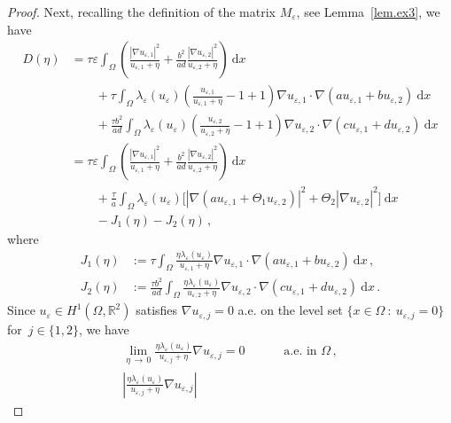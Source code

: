 \documentclass[AHL,Unicode,longabstracts,published]{cedram}
\newcommand{\bbR}{\mathbb{R}}
\newcommand{\rmd}{\mathrm{d}}
\begin{document}
\begin{proof}
Next, recalling the definition of the matrix $M_\varepsilon$, see Lemma~\ref{lem.ex3}, we have
\begin{align*}
D(\eta) & = \tau\varepsilon\int_\Omega
\left(\frac{|\nabla u_{\varepsilon,1}|^2}{u_{\varepsilon,1}+\eta} +\frac{b^2}{ad} \frac{|\nabla u_{\varepsilon,2}|^2}{u_{\varepsilon,2}+\eta} \right)\ \rmd x \\
&\qquad + \tau \int_\Omega \lambda_\varepsilon(u_{\varepsilon}) \left(\frac{u_{\varepsilon,1}}{u_{\varepsilon,1}+\eta} - 1 + 1 \right) \nabla u_{\varepsilon,1}\cdot \nabla(a u_{\varepsilon,1} +b u_{\varepsilon,2}) \ \rmd x \\
&\qquad + \frac{\tau b^2}{ad} \int_\Omega \lambda_\varepsilon(u_{\varepsilon}) \left(\frac{ u_{\varepsilon,2}}{u_{\varepsilon,2}+\eta} - 1 + 1 \right)
\nabla u_{\varepsilon,2}\cdot \nabla(c u_{\varepsilon,1} +d u_{\varepsilon,2}) \ \rmd x \\
&=\tau\varepsilon\int_\Omega \left(\frac{|\nabla u_{\varepsilon,1}|^2}{u_{\varepsilon,1}+\eta} +\frac{b^2}{ad} \frac{|\nabla u_{\varepsilon,2}|^2}{u_{\varepsilon,2}+\eta} \right)\ \rmd x \\
& \qquad + \frac{\tau}{a} \int_\Omega\lambda_\varepsilon(u_{\varepsilon}) \big[|\nabla(a u_{\varepsilon,1}+\Theta_1 u_{\varepsilon,2})|^2 + \Theta_2|\nabla u_{\varepsilon,2} |^2 \big]\ \rmd x\\
& \qquad - J_1(\eta) - J_2(\eta)\,,
\end{align*}
where
\begin{align*}
J_1(\eta) & := \tau \int_\Omega \frac{\eta\lambda_\varepsilon(u_{\varepsilon}) }{u_{\varepsilon,1}+\eta} \nabla u_{\varepsilon,1} \cdot \nabla(a u_{\varepsilon,1} + b u_{\varepsilon,2}) \ \rmd x\,, \\
J_2(\eta) & := \frac{\tau b^2}{ad} \int_\Omega \frac{\eta\lambda_\varepsilon(u_{\varepsilon}) }{u_{\varepsilon,2}+\eta} \nabla u_{\varepsilon,2} \cdot \nabla(c u_{\varepsilon,1} + d u_{\varepsilon,2}) \ \rmd x\,.
\end{align*}
Since $u_{\varepsilon}\in H^1(\Omega,\bbR^2)$ satisfies $\nabla u_{\varepsilon,j}=0$ a.e. on the level set $\{x\in\Omega\ : \ u_{\varepsilon,j}=0\}$ for~$j\in\{1,2\}$, we have
\begin{align*}
\lim_{\eta\,\to\,0} \frac{\eta\lambda_\varepsilon(u_{\varepsilon}) }{u_{\varepsilon,j}+\eta} \nabla u_{\varepsilon,j}=0\qquad &\text{ a.e. in $\Omega$}\,, \\
 \left| \frac{\eta\lambda_\varepsilon(u_{\varepsilon}) }{u_{\varepsilon,j}+\eta} \nabla u_{\varepsilon,j} \right|

\end{align*}
\end{proof}
\end{document}

